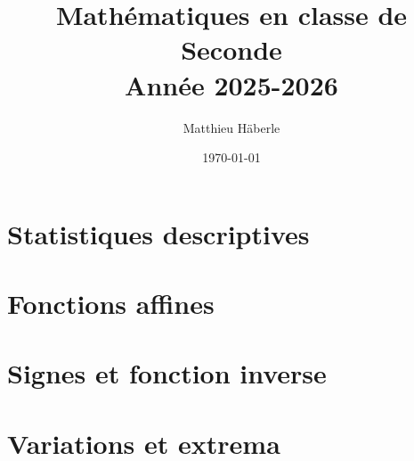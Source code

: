 \documentclass[a4paper, 12pt]{report}
\title{\Huge{Mathématiques en classe de Seconde}\\ Année 2025-2026}
\author{\huge{Matthieu Häberle}}
\date{\today}
\begin{document}
\maketitle
\newpage%
\tableofcontents
\pagebreak















\chapter{Statistiques descriptives}

\chapter{Fonctions affines}



\chapter{Signes et fonction inverse}



\chapter{Variations et extrema}


\end{document}
